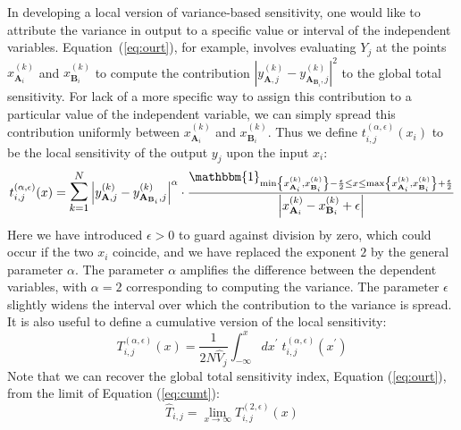 \documentclass[12pt]{article}
\begin{document}
In developing a local version of variance-based sensitivity, one would like to attribute the variance in output to a specific value or interval of the independent variables. Equation~(\ref{eq:ourt}), for example, involves evaluating $Y_j$ at the points $x_{\mathbf{A}_i}^{(k)}$ and $x_{\mathbf{B}_i}^{(k)}$ to compute the contribution $\left| y_{\mathbf{A},j}^{(k)} - y_{\mathbf{A}_{\mathbf{B}_i},j}^{(k)} \right| ^2$ to the global total sensitivity. For lack of a more specific way to assign this contribution to a particular value of the independent variable, we can simply spread this contribution uniformly between $x_{\mathbf{A}_i}^{(k)}$ and $x_{\mathbf{B}_i}^{(k)}$.
Thus we define $t_{i,j}^{(\alpha,\epsilon)}(x_i)$ to be the local sensitivity of the output $y_j$ upon the input $x_i$:
\begin{equation}
    t_{i,j}^{(\alpha,\epsilon)}(x) = \mathlarger{\mathlarger{\sum}}_{k=1}^N \left| y_{\mathbf{A},j}^{(k)} - y_{\mathbf{A}_{\mathbf{B}_i},j}^{(k)} \right| ^ \alpha  \cdot \frac{\mathbbm{1}_{\min \left\{ x_{\mathbf{A}_i}^{(k)} , x_{\mathbf{B}_i}^{(k)} \right\} - \frac{\epsilon}{2} \leq x \leq \max \left\{ x_{\mathbf{A}_i}^{(k)} , x_{\mathbf{B}_i}^{(k)} \right\} + \frac{\epsilon}{2}}}{\left| x_{\mathbf{A}_i}^{(k)} - x_{\mathbf{B}_i}^{(k)} + \epsilon \right|} \label{eq:tx}
\end{equation}
Here we have introduced $\epsilon > 0$ to guard against division by zero, which could occur if the two $x_i$ coincide, and we have replaced the exponent $2$ by the general parameter $\alpha$. The parameter $\alpha$ amplifies the difference between the dependent variables, with $\alpha = 2$ corresponding to computing the variance. The parameter $\epsilon$ slightly widens the interval over which the contribution to the variance is spread. It is also useful to define a cumulative version of the local sensitivity:
\begin{equation}
    T_{i,j}^{(\alpha,\epsilon)}(x) = \frac{1}{2 N \hat{V}_j} \int_{-\infty}^x d x^\prime \; t_{i,j}^{(\alpha,\epsilon)}(x^\prime) \label{eq:cumt}
\end{equation}
Note that we can recover the global total sensitivity index, Equation (\ref{eq:ourt}), from the limit of Equation (\ref{eq:cumt}):
\begin{equation*}
    \hat{T}_{i,j} = \lim_{x \rightarrow \infty} T_{i,j}^{(2,\epsilon)}(x)
\end{equation*}
\end{document}
